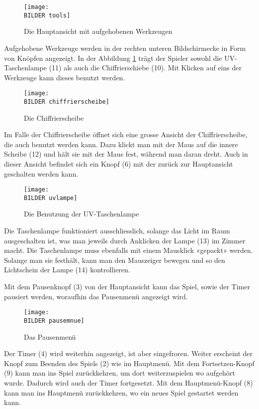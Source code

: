 \begin{figure}[h!]
	\centering
		\texttt{[image: \\BILDER tools]}
 	\caption{Die Hauptansicht mit aufgehobenen Werkzeugen}
  \label{fig:werkzeuge}
\end{figure}

Aufgehobene Werkzeuge werden in der rechten unteren Bildschirmecke in Form von Knöpfen angezeigt. In der Abbildung \ref{fig:werkzeuge} trägt der Spieler sowohl die UV-Taschenlampe (11) als auch die Chiffrierschiebe (10). Mit Klicken auf eins der Werkzeuge kann dieses benutzt werden.

\begin{figure}[h!]
	\centering
		\texttt{[image: \\BILDER chiffrierscheibe]}
 	\caption{Die Chiffrierscheibe}
  \label{fig:chiffrierscheibe}
\end{figure}

Im Falle der Chiffrierscheibe öffnet sich eine grosse Ansicht der Chiffrierscheibe, die auch benutzt werden kann. Dazu klickt man mit der Maus auf die innere Scheibe (12) und hält sie mit der Maus fest, während man daran dreht. Auch in dieser Ansicht befindet sich ein Knopf (6) mit der zurück zur Hauptansicht geschalten werden kann.

\begin{figure}[h!]
	\centering
		\texttt{[image: \\BILDER uvlampe]}
 	\caption{Die Benutzung der UV-Taschenlampe}
  \label{fig:uvlampe}
\end{figure}

Die Taschenlampe funktioniert ausschliesslich, solange das Licht im Raum ausgeschalten ist, was man jeweils durch Anklicken der Lampe (13) im Zimmer macht. Die Taschenlampe muss ebenfalls mit einem Mausklick «gepackt» werden. Solange man sie festhält, kann man den Mauszeiger bewegen und so den Lichtschein der Lampe (14) kontrollieren. 

Mit dem Pausenknopf (3) von der Hauptansicht kann das Spiel, sowie der Timer pausiert werden, woraufhin das Pausenmenü angezeigt wird.

\begin{figure}[htbp]
	\centering
		\texttt{[image: \\BILDER pausemnue]}
 	\caption{Das Pausenmenü}
  \label{fig:pausemenu}
\end{figure}

Der Timer (4) wird weiterhin angezeigt, ist aber eingefroren. Weiter erscheint der Knopf zum Beenden des Spiels (2) wie im Hauptmenü. Mit dem Fortsetzen-Knopf (9) kann man ins Spiel zurückkehren, um dort weiterzuspielen wo aufgehört wurde. Dadurch wird auch der Timer fortgesetzt. Mit dem Hauptmenü-Knopf (8) kann man ins Hauptmenü zurückkehren, wo ein neues Spiel gestartet werden kann.


